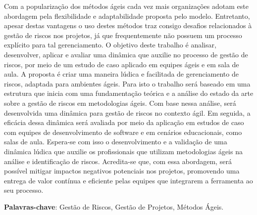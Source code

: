 \documentclass[
	12pt,
	openright,
	twoside,
	a4paper,
	english,
	brazil
	]{abntex2}
\begin{document}
\frenchspacing


\imprimircapa


\imprimirfolhaderosto*


\setlength{\absparsep}{18pt}
\begin{resumo}
  Com a popularização dos métodos ágeis cada vez mais organizações adotam este abordagem pela flexibilidade  e adaptabilidade proposta pelo modelo. Entretanto, apesar destas vantagens o uso destes métodos traz consigo desafios relacionados à gestão de riscos nos projetos, já que frequentemente não possuem um processo explícito para tal gerenciamento.
  O objetivo deste trabalho é analisar, desenvolver, aplicar e avaliar uma dinâmica que auxilie no processo de gestão de riscos, por meio de um estudo de caso aplicado em equipes ágeis e em sala de aula. A proposta é criar uma maneira lúdica e facilitada de gerenciamento de riscos, adaptada para ambientes ágeis.
  Para isto o trabalho será baseado em uma estrutura que inicia com uma fundamentação teórica e a análise do estado da arte sobre a gestão de riscos em metodologias ágeis. Com base nessa análise, será desenvolvida uma dinâmica para gestão de riscos no contexto ágil. Em seguida, a eficácia dessa dinâmica será avaliada por meio da aplicação em estudos de caso com equipes de desenvolvimento de software e em cenários educacionais, como salas de aula.
  Espera-se com isso o desenvolvimento e a validação de uma dinâmica lúdica que auxilie os profissionais que utilizam metodologias ágeis na análise e identificação de riscos. Acredita-se que, com essa abordagem, será possível mitigar impactos negativos potenciais nos projetos, promovendo uma entrega de valor contínua e eficiente pelas equipes que integrarem a ferramenta ao seu processo. 
  \vspace{\onelineskip}

  \noindent\textbf{Palavras-chave}: Gestão de Riscos, Gestão de Projetos, Métodos Ágeis.

\end{resumo}

\end{document}
